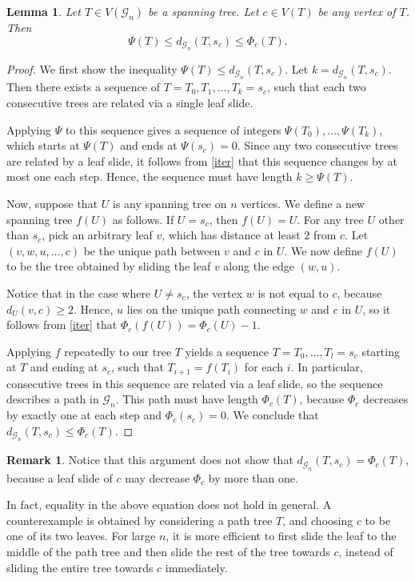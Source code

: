 \documentclass[reqno,dvipsnames]{amsart}
\theoremstyle{plain}
\newtheorem{lemma}[theorem]{Lemma}
\numberwithin{equation}{section}
\theoremstyle{definition}
\newtheorem{remark}[theorem]{Remark}
\begin{document}
\begin{lemma}\label{boundineq}
	Let $T\in V(\mathcal{G}_n)$ be a spanning tree. Let $c\in V(T)$ be any vertex of $T$. Then 
	\[
	\Psi(T) \leq d_{\mathcal{G}_n}(T, s_c) \leq \Phi_c(T).
	\]
\end{lemma}

\begin{proof}
	We first show the inequality $\Psi(T) \leq d_{\mathcal{G}_n}(T, s_c)$. Let $k = d_{\mathcal{G}_n}(T,s_c)$. Then there exists a sequence of $T = T_0,T_1,\dots,T_k = s_c$, such that each two consecutive trees are related via a single leaf slide. 

	Applying $\Psi$ to this sequence gives a sequence of integers $\Psi(T_0),\dots, \Psi(T_k)$, which starts at $\Psi(T)$ and ends at $\Psi(s_c) = 0$. Since any two consecutive trees are related by a leaf slide, it follows from \autoref{iter} that this sequence changes by at most one each step. Hence, the sequence must have length $k\geq \Psi(T)$.

	Now, suppose that $U$ is any spanning tree on $n$ vertices. We define a new spanning tree $f(U)$ as follows. If $U = s_c$, then $f(U) = U$. For any tree $U$ other than $s_c$, pick an arbitrary leaf $v$, which has distance at least $2$ from $c$. Let $(v,w,u ,\dots, c)$ be the unique path between $v$ and $c$ in $U$. We now define $f(U)$ to be the tree obtained by sliding the leaf $v$ along the edge $(w,u)$.

	Notice that in the case where $U\neq s_c$, the vertex $w$ is not equal to $c$, because $d_U(v,c)\geq 2$. Hence, $u$ lies on the unique path connecting $w$ and $c$ in $U$, so it follows from \autoref{iter} that $\Phi_c(f(U)) = \Phi_c(U) - 1$. 

	Applying $f$ repeatedly to our tree $T$ yields a sequence $T = T_0,\dots ,T_l = s_c$ starting at $T$ and ending at $s_c$, such that $T_{i+1} = f(T_i)$ for each $i$. In particular, consecutive trees in this sequence are related via a leaf slide, so the sequence describes a path in $\mathcal{G}_n$. This path must have length $\Phi_c(T)$, because $\Phi_c$ decreases by exactly one at each step and $\Phi_c(s_c) = 0$. We conclude that $d_{\mathcal{G}_n}(T,s_c)\leq \Phi_c(T)$.

\end{proof}

\begin{remark}
	Notice that this argument does not show that $d_{\mathcal{G}_n}(T,s_c) =  \Phi_c(T)$, because a leaf slide of $c$ may decrease $\Phi_c$ by more than one.

	In fact, equality in the above equation does not hold in general. A counterexample is obtained by considering a path tree $T$, and choosing $c$ to be one of its two leaves. For large $n$, it is more efficient to first slide the leaf to the middle of the path tree and then slide the rest of the tree towards $c$, instead of sliding the entire tree towards $c$ immediately.
\end{remark}
\end{document}
